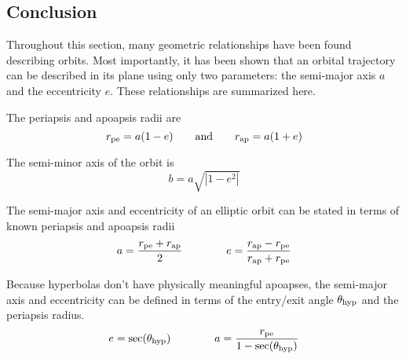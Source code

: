 \documentclass[../basicOrbitalDynamics.tex]{subfiles}
\begin{document}
\bigskip\bigskip
\subsection{Conclusion}

Throughout this section, many geometric relationships have been found describing orbits. Most importantly, it has been shown that an orbital trajectory can be described in its plane using only two parameters: the semi-major axis $a$ and the eccentricity $e$. These relationships are summarized here.

\bigskip
The periapsis and apoapsis radii are
\[{r}_\text{pe}=a(1-e)\qquad\text{and}\qquad {r}_\text{ap}=a(1+e)\]

\bigskip
The semi-minor axis of the orbit is
\[b=a\sqrt{|1-e^2|}\]

\bigskip
The semi-major axis and eccentricity of an elliptic orbit can be stated in terms of known periapsis and apoapsis radii
\[a=\frac{{r}_\text{pe}+{r}_\text{ap}}{2}\qquad\qquad e=\frac{{r}_\text{ap}-{r}_\text{pe}}{{r}_\text{ap}+{r}_\text{pe}}\]

Because hyperbolas don't have physically meaningful apoapses, the semi-major axis and eccentricity can be defined in terms of the entry/exit angle ${\theta}_\text{hyp}$ and the periapsis radius.
\[e=\sec({\theta}_\text{hyp})\qquad\qquad a=\frac{{{r}_\text{pe}}}{1-\sec({\theta}_\text{hyp})}\]
\end{document}
